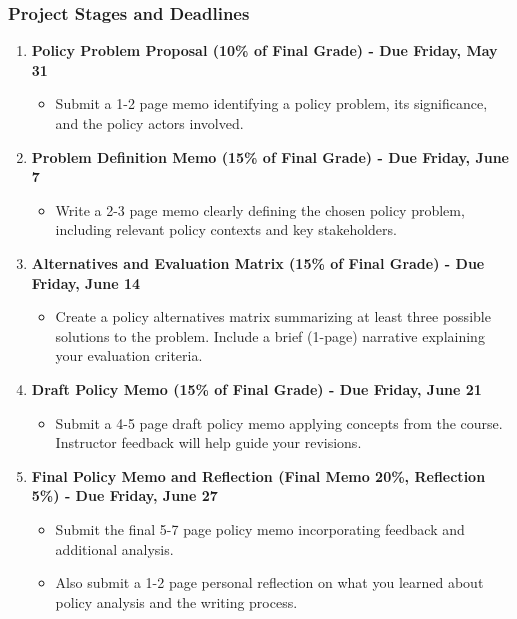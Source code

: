 \documentclass[11pt, letterpaper]{article}
\begin{document}
\subsubsection*{Project Stages and Deadlines}
\begin{enumerate}
    \item \textbf{Policy Problem Proposal (10\% of Final Grade) - Due Friday, May 31} 
    \begin{itemize}
        \item Submit a 1-2 page memo identifying a policy problem, its significance, and the policy actors involved.
    \end{itemize}

    \item \textbf{Problem Definition Memo (15\% of Final Grade) - Due Friday, June 7}
    \begin{itemize}
        \item Write a 2-3 page memo clearly defining the chosen policy problem, including relevant policy contexts and key stakeholders.
    \end{itemize}

    \item \textbf{Alternatives and Evaluation Matrix (15\% of Final Grade) - Due Friday, June 14}
    \begin{itemize}
        \item Create a policy alternatives matrix summarizing at least three possible solutions to the problem. Include a brief (1-page) narrative explaining your evaluation criteria.
    \end{itemize}

    \item \textbf{Draft Policy Memo (15\% of Final Grade) - Due Friday, June 21}
    \begin{itemize}
        \item Submit a 4-5 page draft policy memo applying concepts from the course. Instructor feedback will help guide your revisions.
    \end{itemize}

    \item \textbf{Final Policy Memo and Reflection (Final Memo 20\%, Reflection 5\%) - Due Friday, June 27}
    \begin{itemize}
        \item Submit the final 5-7 page policy memo incorporating feedback and additional analysis. 
        \item Also submit a 1-2 page personal reflection on what you learned about policy analysis and the writing process.
    \end{itemize}
\end{enumerate}
\end{document}
